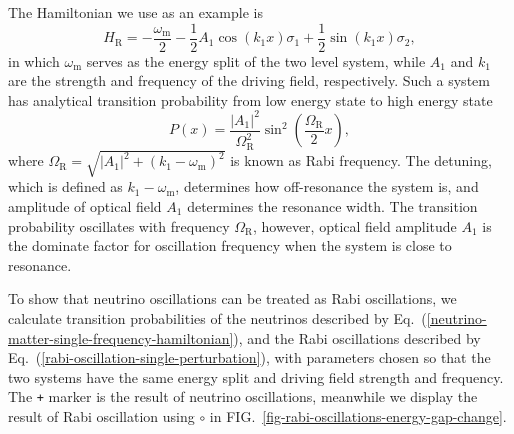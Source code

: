\documentclass[%
preprint,
 amsmath,amssymb,
 aps,
]{revtex4-1}
\begin{document}
The Hamiltonian we use as an example is
\begin{equation}
    H_{\mathrm R} = - \frac{\omega_{\mathrm m}}{2} - \frac{1}{2}A_{1} \cos (k_1 x) \sigma_1 + \frac{1}{2} \sin (k_1 x) \sigma_2,\label{rabi-oscillation-single-perturbation}
\end{equation}
in which $\omega_{\mathrm m}$ serves as the energy split of the two level system, while $A_1$ and $k_1$ are the strength and frequency of the driving field, respectively. Such a system has analytical transition probability from low energy state to high energy state
\begin{equation}
    P(x) = \frac{\left \lvert A_1 \right \rvert ^2}{ \Omega_{\mathrm R}^2 } \sin^2 \left( \frac{\Omega_{\mathrm R}}{2} x \right),
\end{equation}
where $\Omega_{\mathrm R} = \sqrt{ \lvert A_1\rvert^2 + (k_1 - \omega_{\mathrm m})^2 }$ is known as Rabi frequency. The detuning, which is defined as $k_1 - \omega_{\mathrm m}$, determines how off-resonance the system is, and amplitude of optical field $A_1$ determines the resonance width. The transition probability oscillates with frequency $\Omega_{\mathrm R}$, however, optical field amplitude $A_1$ is the dominate factor for oscillation frequency when the system is close to resonance.






To show that neutrino oscillations can be treated as Rabi oscillations, we calculate transition probabilities of the neutrinos described by Eq.~(\ref{neutrino-matter-single-frequency-hamiltonian}), and the Rabi oscillations described by Eq.~(\ref{rabi-oscillation-single-perturbation}), with parameters chosen so that the two systems have the same energy split and driving field strength and frequency. The \verb|+| marker is the result of neutrino oscillations, meanwhile we display the result of Rabi oscillation using $\circ$ in FIG.~\ref{fig-rabi-oscillations-energy-gap-change}.

\end{document}

